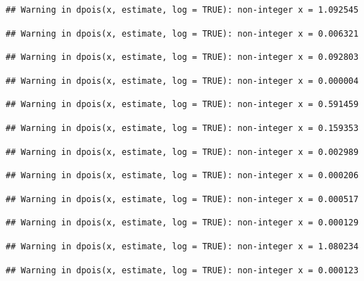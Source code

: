 \documentclass[]{article}
\begin{document}
\begin{verbatim}
## Warning in dpois(x, estimate, log = TRUE): non-integer x = 1.092545
\end{verbatim}

\begin{verbatim}
## Warning in dpois(x, estimate, log = TRUE): non-integer x = 0.006321
\end{verbatim}

\begin{verbatim}
## Warning in dpois(x, estimate, log = TRUE): non-integer x = 0.092803
\end{verbatim}

\begin{verbatim}
## Warning in dpois(x, estimate, log = TRUE): non-integer x = 0.000004
\end{verbatim}

\begin{verbatim}
## Warning in dpois(x, estimate, log = TRUE): non-integer x = 0.591459
\end{verbatim}

\begin{verbatim}
## Warning in dpois(x, estimate, log = TRUE): non-integer x = 0.159353
\end{verbatim}

\begin{verbatim}
## Warning in dpois(x, estimate, log = TRUE): non-integer x = 0.002989
\end{verbatim}

\begin{verbatim}
## Warning in dpois(x, estimate, log = TRUE): non-integer x = 0.000206
\end{verbatim}

\begin{verbatim}
## Warning in dpois(x, estimate, log = TRUE): non-integer x = 0.000517
\end{verbatim}

\begin{verbatim}
## Warning in dpois(x, estimate, log = TRUE): non-integer x = 0.000129
\end{verbatim}

\begin{verbatim}
## Warning in dpois(x, estimate, log = TRUE): non-integer x = 1.080234
\end{verbatim}

\begin{verbatim}
## Warning in dpois(x, estimate, log = TRUE): non-integer x = 0.000123
\end{verbatim}
\end{document}
